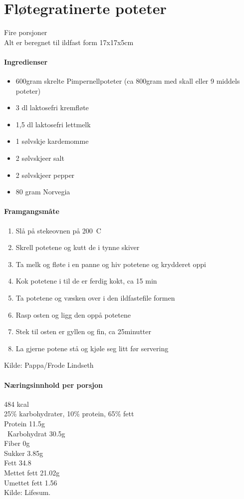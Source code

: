 \section{﻿Fløtegratinerte poteter}
\label{flotegratinerte}
Fire porsjoner\\
Alt er beregnet til ildfast form 17x17x5cm

\paragraph{Ingredienser}
\begin{itemize}[noitemsep]
	\item 600gram skrelte Pimpernellpoteter (ca 800gram med skall eller 9 middels poteter)
	\item	3 dl laktosefri kremfløte
	\item 1,5 dl laktosefri lettmelk
	\item 1 sølvskje kardemomme
	\item 2 sølvskjeer salt
	\item 2 sølvskjeer pepper
	\item 80 gram Norvegia
\end{itemize}

\paragraph{Framgangsmåte}
\begin{enumerate}[noitemsep]
	\item Slå på stekeovnen på 200\degree~C
	\item Skrell potetene og kutt de i tynne skiver
	\item Ta melk og fløte i en panne og hiv potetene og krydderet oppi
	\item Kok potetene i til de er ferdig kokt, ca 15 min
	\item Ta potetene og væsken over i den ildfastefile formen
	\item Rasp osten og ligg den oppå potetene
	\item Stek til osten er gyllen og fin, ca 25minutter
	\item La gjerne potene stå og kjøle seg litt før servering
\end{enumerate}

Kilde: Pappa/Frode Lindseth\\


\paragraph{Næringsinnhold per porsjon}
484 kcal\\
25\% karbohydrater, 10\% protein, 65\% fett\\
Protein 11.5g\\\
Karbohydrat 30.5g\\
Fiber 0g\\
Sukker 3.85g\\
Fett 34.8\\
Mettet fett 21.02g\\
Umettet fett 1.56\\
Kilde: Lifesum.
